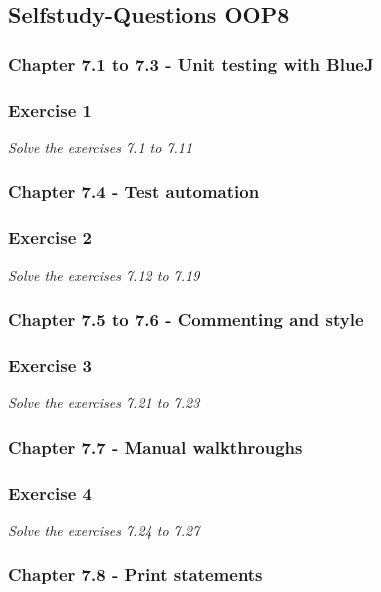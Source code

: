\subsection{Selfstudy-Questions OOP8}

\subsubsection{Chapter 7.1 to 7.3 - Unit testing with BlueJ}

\subsubsection*{Exercise 1}
\textit{Solve the exercises 7.1 to 7.11} \\

\subsubsection{Chapter 7.4 - Test automation}

\subsubsection*{Exercise 2}
\textit{Solve the exercises 7.12 to 7.19} \\

\subsubsection{Chapter 7.5 to 7.6 - Commenting and style}

\subsubsection*{Exercise 3}
\textit{Solve the exercises 7.21 to 7.23} \\

\subsubsection{Chapter 7.7 - Manual walkthroughs}

\subsubsection*{Exercise 4}
\textit{Solve the exercises 7.24 to 7.27}

\subsubsection{Chapter 7.8 - Print statements}

